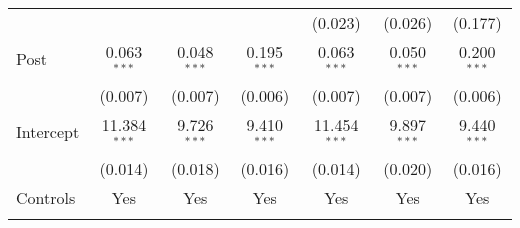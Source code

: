 \begin{tabular}{@{\extracolsep{5pt}}lcccccc}
                        &                                                                      &                  &                   & (0.023)           & (0.026)          & (0.177)           \\
    Post                & 0.063$^{***}$                                                        & 0.048$^{***}$    & 0.195$^{***}$    & 0.063$^{***}$     & 0.050$^{***}$    & 0.200$^{***}$    \\
                        & (0.007)                                                              & (0.007)          & (0.006)           & (0.007)           & (0.007)          & (0.006)           \\
    Intercept           & 11.384$^{***}$                                                       & 9.726$^{***}$    & 9.410$^{***}$     & 11.454$^{***}$    & 9.897$^{***}$    & 9.440$^{***}$     \\
                        & (0.014)                                                              & (0.018)          & (0.016)           & (0.014)           & (0.020)          & (0.016)           \\
    Controls            & Yes                                                                  & Yes              & Yes               & Yes               & Yes              & Yes               \\
    \hline                                                                                                                                                                                       \\[-1.8ex]

\end{tabular}
